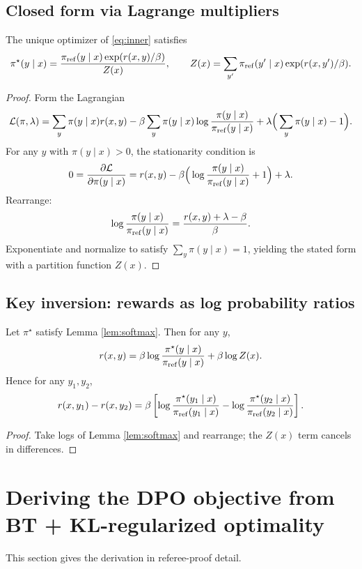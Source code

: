 \subsection{Closed form via Lagrange multipliers}
\begin{lemma}\label{lem:softmax}
The unique optimizer of \eqref{eq:inner} satisfies
\[
\pi^\star(y\mid x)
=
\frac{\pi_{\mathrm{ref}}(y\mid x)\exp(r(x,y)/\beta)}{Z(x)},
\qquad
Z(x)=\sum_{y'} \pi_{\mathrm{ref}}(y'\mid x)\exp(r(x,y')/\beta).
\]
\end{lemma}
\begin{proof}
Form the Lagrangian
\[
\mathcal{L}(\pi,\lambda)
=
\sum_y \pi(y\mid x)r(x,y)
-
\beta\sum_y \pi(y\mid x)\log\frac{\pi(y\mid x)}{\pi_{\mathrm{ref}}(y\mid x)}
+
\lambda\Big(\sum_y \pi(y\mid x)-1\Big).
\]
For any $y$ with $\pi(y\mid x)>0$, the stationarity condition is
\[
0=\frac{\partial\mathcal{L}}{\partial \pi(y\mid x)}
=
r(x,y) -\beta\Big(\log\frac{\pi(y\mid x)}{\pi_{\mathrm{ref}}(y\mid x)}+1\Big)+\lambda.
\]
Rearrange:
\[
\log\frac{\pi(y\mid x)}{\pi_{\mathrm{ref}}(y\mid x)}=\frac{r(x,y)+\lambda-\beta}{\beta}.
\]
Exponentiate and normalize to satisfy $\sum_y \pi(y\mid x)=1$, yielding the stated form with a partition function $Z(x)$.
\end{proof}

\subsection{Key inversion: rewards as log probability ratios}
\begin{corollary}\label{cor:logratio}
Let $\pi^\star$ satisfy Lemma \ref{lem:softmax}. Then for any $y$,
\[
r(x,y)
=
\beta\log\frac{\pi^\star(y\mid x)}{\pi_{\mathrm{ref}}(y\mid x)} + \beta\log Z(x).
\]
Hence for any $y_1,y_2$,
\[
r(x,y_1)-r(x,y_2)
=
\beta\left[
\log\frac{\pi^\star(y_1\mid x)}{\pi_{\mathrm{ref}}(y_1\mid x)}-\log\frac{\pi^\star(y_2\mid x)}{\pi_{\mathrm{ref}}(y_2\mid x)}
\right].
\]
\end{corollary}
\begin{proof}
Take logs of Lemma \ref{lem:softmax} and rearrange; the $Z(x)$ term cancels in differences.
\end{proof}

\section{Deriving the DPO objective from BT + KL-regularized optimality}\label{app:dpo}

This section gives the derivation in referee-proof detail.

